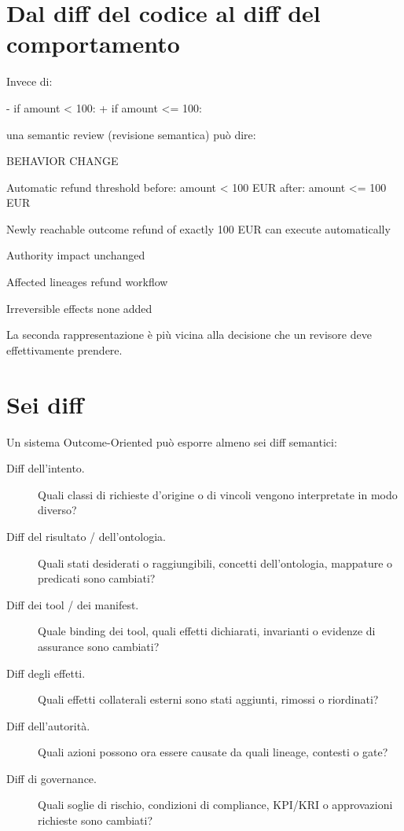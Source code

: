 \documentclass[10pt,oneside,openany]{book}
\begin{document}
\section{Dal diff del codice al diff del comportamento}
Invece di:

\begin{codeblock}
- if amount < 100:
+ if amount <= 100:
\end{codeblock}

una semantic review (revisione semantica) può dire:

\begin{codeblock}
BEHAVIOR CHANGE

Automatic refund threshold
  before: amount < 100 EUR
  after:  amount <= 100 EUR

Newly reachable outcome
  refund of exactly 100 EUR can execute automatically

Authority impact
  unchanged

Affected lineages
  refund workflow

Irreversible effects
  none added
\end{codeblock}

La seconda rappresentazione è più vicina alla decisione che un revisore deve effettivamente prendere.

\section{Sei diff}
Un sistema Outcome-Oriented può esporre almeno sei diff semantici:

\begin{description}
\item[Diff dell'intento.] Quali classi di richieste d'origine o di vincoli vengono interpretate in modo diverso?
\item[Diff del risultato / dell'ontologia.] Quali stati desiderati o raggiungibili, concetti dell'ontologia, mappature o predicati sono cambiati?
\item[Diff dei tool / dei manifest.] Quale binding dei tool, quali effetti dichiarati, invarianti o evidenze di assurance sono cambiati?
\item[Diff degli effetti.] Quali effetti collaterali esterni sono stati aggiunti, rimossi o riordinati?
\item[Diff dell'autorità.] Quali azioni possono ora essere causate da quali lineage, contesti o gate?
\item[Diff di governance.] Quali soglie di rischio, condizioni di compliance, KPI/KRI o approvazioni richieste sono cambiati?
\end{description}
\end{document}
